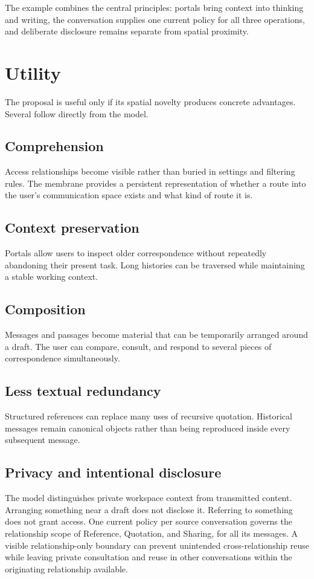 \documentclass[11pt]{article}
\begin{document}
The example combines the central principles: portals bring context into thinking and writing, the conversation supplies one current policy for all three operations, and deliberate disclosure remains separate from spatial proximity.

\section{Utility}

The proposal is useful only if its spatial novelty produces concrete advantages. Several follow directly from the model.

\subsection*{Comprehension}
Access relationships become visible rather than buried in settings and filtering rules. The membrane provides a persistent representation of whether a route into the user's communication space exists and what kind of route it is.

\subsection*{Context preservation}
Portals allow users to inspect older correspondence without repeatedly abandoning their present task. Long histories can be traversed while maintaining a stable working context.

\subsection*{Composition}
Messages and passages become material that can be temporarily arranged around a draft. The user can compare, consult, and respond to several pieces of correspondence simultaneously.

\subsection*{Less textual redundancy}
Structured references can replace many uses of recursive quotation. Historical messages remain canonical objects rather than being reproduced inside every subsequent message.

\subsection*{Privacy and intentional disclosure}
The model distinguishes private workspace context from transmitted content. Arranging something near a draft does not disclose it. Referring to something does not grant access. One current policy per source conversation governs the relationship scope of Reference, Quotation, and Sharing, for all its messages. A visible relationship-only boundary can prevent unintended cross-relationship reuse while leaving private consultation and reuse in other conversations within the originating relationship available.
\end{document}
